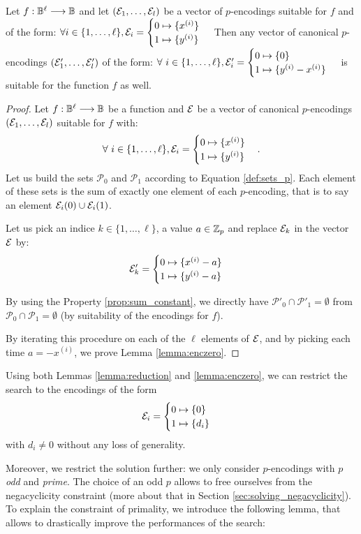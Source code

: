 \begin{lemma}
    Let $f: \mathbb{B}^\ell \longrightarrow \mathbb{B}$ and let $(\mathcal{E}_1, \dots, \mathcal{E}_l)$ be a vector of $p$-encodings suitable for $f$ and of the form: $\forall i \in \{1, \dots, \ell\}, \mathcal{E}_i = \begin{cases} 0 \mapsto \{x^{(i)}\} \\ 1 \mapsto \{y^{(i)}\} \end{cases}$
    Then any vector of canonical $p$-encodings $(\mathcal{E}'_1, \dots, \mathcal{E}'_l)$ of the form: $\forall~i \in \{1, \dots, \ell\}, \mathcal{E}'_i = \begin{cases} 0 \mapsto \{0\} \\ 1 \mapsto \{y^{(i)} - x^{(i)}\} \end{cases}$
    is suitable for the function $f$ as well.
    \label{lemma:enczero}
\end{lemma}


\begin{proof}
Let $f: \mathbb{B}^\ell \longrightarrow \mathbb{B}$ be a function and $\mathcal{E}$ be a vector of canonical $p$-encodings $(\mathcal{E}_1, \dots, \mathcal{E}_l)$ suitable for $f$ with:
$$
\forall~i \in \{1, \dots, \ell\}, \mathcal{E}_i = \begin{cases} 0 \mapsto \{x^{(i)}\} \\ 1 \mapsto \{y^{(i)}\} \end{cases}.
$$
Let us build the sets $\mathcal{P}_0$ and $\mathcal{P}_1$ according to Equation \ref{def:sets_p}. Each element of these sets is the sum of exactly one element of each $p$-encoding, that is to say an element $\mathcal{E}_i(0) \cup \mathcal{E}_i(1)$.

Let us pick an indice $k \in \{1, \dots, \ell\}$, a value $a \in \mathbb{Z}_p$ and replace $\mathcal{E}_k$ in the vector $\mathcal{E}$ by: 
$$
\mathcal{E}'_k = \begin{cases} 0 \mapsto \{x^{(i)} - a\} \\ 1 \mapsto \{y^{(i)} - a\} \end{cases}
$$

By using the Property \ref{prop:sum_constant}, we directly have $\mathcal{P}'_0 \cap \mathcal{P}'_1 = \emptyset$ from $\mathcal{P}_0 \cap \mathcal{P}_1 = \emptyset$ (by suitability of the encodings for $f$).

By iterating this procedure on each of the $\ell$ elements of $\mathcal{E}$, and by picking each time $a = -x^{(i)}$, we prove Lemma \ref{lemma:enczero}.
\end{proof}



Using both Lemmas \ref{lemma:reduction} and \ref{lemma:enczero}, we can restrict the search to the encodings of the form $$\mathcal{E}_i = \begin{cases} 0 \mapsto \{0\} \\ 1 \mapsto \{d_i\} \end{cases}$$ with $d_i \ne 0$ without any loss of generality. 


Moreover, we restrict the solution further: we only consider $p$-encodings with $p$ \emph{odd} and \emph{prime}. The choice of an odd $p$ allows to free ourselves from the negacyclicity constraint (more about that in Section \ref{sec:solving_negacyclicity}). To explain the constraint of primality, we introduce the following lemma, that allows to drastically improve the performances of the search:

